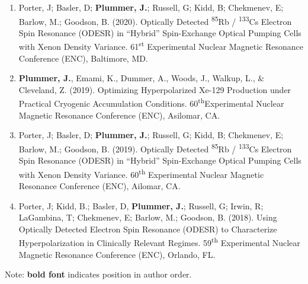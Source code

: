 \documentclass[12pt,]{scrartcl}
\begin{document}
\begin{enumerate}
  \item Porter, J; Basler, D; \textbf{Plummer, J.}; Russell, G; Kidd, B; Chekmenev, E; Barlow, M.; Goodson, B. (2020). Optically Detected \textsuperscript{85}Rb / \textsuperscript{133}Cs Electron Spin Resonance (ODESR) in “Hybrid” Spin-Exchange Optical Pumping Cells with Xenon Density Variance. 61\textsuperscript{st} Experimental Nuclear Magnetic Resonance Conference (ENC), Baltimore, MD. 
  \item \textbf{Plummer, J.}, Emami, K., Dummer, A., Woods, J., Walkup, L., \& Cleveland, Z. (2019). Optimizing Hyperpolarized Xe-129 Production under Practical Cryogenic Accumulation Conditions. 60\textsuperscript{th}Experimental Nuclear Magnetic Resonance Conference (ENC), Asilomar, CA. 
  \item Porter, J; Basler, D; \textbf{Plummer, J.}; Russell, G; Kidd, B; Chekmenev, E; Barlow, M.; Goodson, B. (2019). Optically Detected \textsuperscript{85}Rb / \textsuperscript{133}Cs Electron Spin Resonance (ODESR) in “Hybrid” Spin-Exchange Optical Pumping Cells with Xenon Density Variance. 60\textsuperscript{th} Experimental Nuclear Magnetic Resonance Conference (ENC), Ailomar, CA. 
  \item Porter, J; Kidd, B.; Basler, D, \textbf{Plummer, J.}; Russell, G; Irwin, R; LaGambina, T; Chekmenev, E; Barlow, M.; Goodson, B. (2018). Using Optically Detected Electron Spin Resonance (ODESR) to Characterize Hyperpolarization in Clinically Relevant Regimes. 59\textsuperscript{th} Experimental Nuclear Magnetic Resonance Conference (ENC), Orlando, FL. 

  
\end{enumerate}
Note: \textbf{bold font} indicates position in author order.




\end{document}
